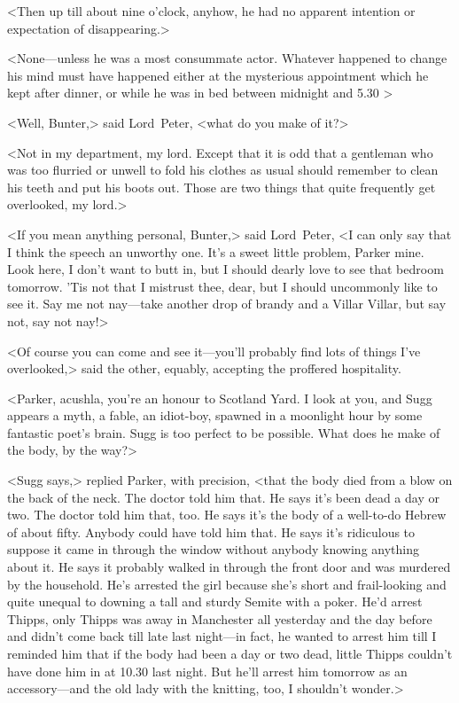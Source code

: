 <Then up till about nine o'clock, anyhow, he had no apparent intention or expectation of disappearing.>

<None—unless he was a most consummate actor. Whatever happened to change his mind must have happened either at the mysterious appointment which he kept after dinner, or while he was in bed between midnight and 5.30 >

<Well, Bunter,> said Lord~Peter, <what do you make of it?>

<Not in my department, my lord. Except that it is odd that a gentleman who was too flurried or unwell to fold his clothes as usual should remember to clean his teeth and put his boots out. Those are two things that quite frequently get overlooked, my lord.>

<If you mean anything personal, Bunter,> said Lord~Peter, <I can only say that I think the speech an unworthy one. It's a sweet little problem, Parker mine. Look here, I don't want to butt in, but I should dearly love to see that bedroom tomorrow. 'Tis not that I mistrust thee, dear, but I should uncommonly like to see it. Say me not nay—take another drop of brandy and a Villar Villar, but say not, say not nay!>

<Of course you can come and see it—you'll probably find lots of things I've overlooked,> said the other, equably, accepting the proffered hospitality.

<Parker, acushla, you're an honour to Scotland Yard. I look at you, and Sugg appears a myth, a fable, an idiot-boy, spawned in a moonlight hour by some fantastic poet's brain. Sugg is too perfect to be possible. What does he make of the body, by the way?>

<Sugg says,> replied Parker, with precision, <that the body died from a blow on the back of the neck. The doctor told him that. He says it's been dead a day or two. The doctor told him that, too. He says it's the body of a well-to-do Hebrew of about fifty. Anybody could have told him that. He says it's ridiculous to suppose it came in through the window without anybody knowing anything about it. He says it probably walked in through the front door and was murdered by the household. He's arrested the girl because she's short and frail-looking and quite unequal to downing a tall and sturdy Semite with a poker. He'd arrest Thipps, only Thipps was away in Manchester all yesterday and the day before and didn't come back till late last night—in fact, he wanted to arrest him till I reminded him that if the body had been a day or two dead, little Thipps couldn't have done him in at 10.30 last night. But he'll arrest him tomorrow as an accessory—and the old lady with the knitting, too, I shouldn't wonder.>

